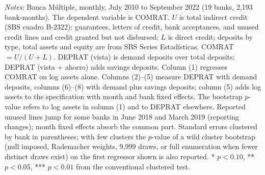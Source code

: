 \begin{table}[!h]
\begin{threeparttable}[b]
      \begin{tablenotes}\item \textit{Notes:} Banca M\'ultiple, monthly, July 2010 to September 2022 (19 banks, 2,193 bank-months). The dependent variable is COMRAT. $U$ is total indirect credit (SBS cuadro B-2322): guarantees, letters of credit, bank acceptances, and unused credit lines and credit granted but not disbursed; $L$ is direct credit; deposits by type, total assets and equity are from SBS Series Estad\'isticas. COMRAT $= U/(U+L)$. DEPRAT (vista) is demand deposits over total deposits; DEPRAT (vista + ahorro) adds savings deposits. Column (1) regresses COMRAT on log assets alone. Columns (2)--(5) measure DEPRAT with demand deposits, columns (6)--(8) with demand plus savings deposits; column (5) adds log assets to the specification with month and bank fixed effects. The bootstrap $p$-value refers to log assets in column (1) and to DEPRAT elsewhere. Reported unused lines jump for some banks in June 2018 and March 2019 (reporting changes); month fixed effects absorb the common part. Standard errors clustered by bank in parentheses; with few clusters the $p$-value of a wild cluster bootstrap (null imposed, Rademacher weights, 9,999 draws, or full enumeration when fewer distinct draws exist) on the first regressor shown is also reported. * $p<0.10$, ** $p<0.05$, *** $p<0.01$ from the conventional clustered test.
      \end{tablenotes}
   \end{threeparttable}
\end{table}


